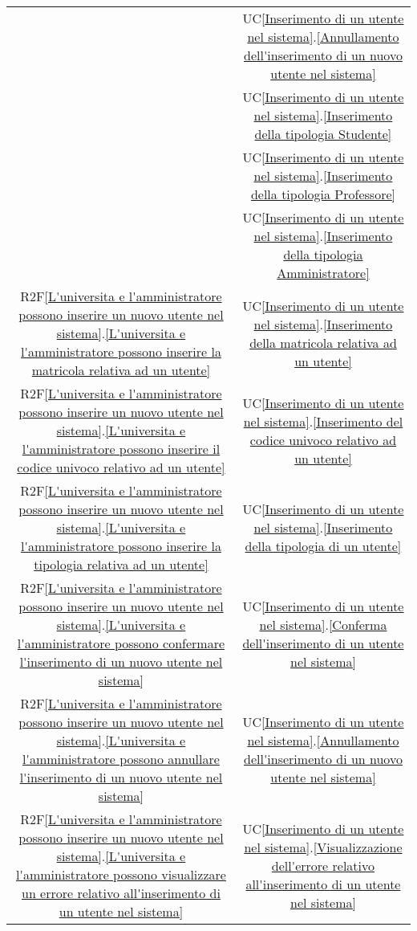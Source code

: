 \begin{longtable}{|c|c|}
& UC\ref{Inserimento di un utente nel sistema}.\ref{Annullamento dell'inserimento di un nuovo utente nel sistema}\\
& UC\ref{Inserimento di un utente nel sistema}.\ref{Inserimento della tipologia Studente}\\
& UC\ref{Inserimento di un utente nel sistema}.\ref{Inserimento della tipologia Professore}\\
& UC\ref{Inserimento di un utente nel sistema}.\ref{Inserimento della tipologia Amministratore}\\
\hline
R2F\ref{L'universita e l'amministratore possono inserire un nuovo utente nel sistema}.\ref{L'universita e l'amministratore possono inserire la matricola relativa ad un utente} & UC\ref{Inserimento di un utente nel sistema}.\ref{Inserimento della matricola relativa ad un utente}\\
\hline
R2F\ref{L'universita e l'amministratore possono inserire un nuovo utente nel sistema}.\ref{L'universita e l'amministratore possono inserire il codice univoco relativo ad un utente} & UC\ref{Inserimento di un utente nel sistema}.\ref{Inserimento del codice univoco relativo ad un utente}\\
\hline
R2F\ref{L'universita e l'amministratore possono inserire un nuovo utente nel sistema}.\ref{L'universita e l'amministratore possono inserire la tipologia relativa ad un utente} & UC\ref{Inserimento di un utente nel sistema}.\ref{Inserimento della tipologia di un utente}\\
\hline
R2F\ref{L'universita e l'amministratore possono inserire un nuovo utente nel sistema}.\ref{L'universita e l'amministratore possono confermare l'inserimento di un nuovo utente nel sistema} & UC\ref{Inserimento di un utente nel sistema}.\ref{Conferma dell'inserimento di un utente nel sistema}\\
\hline
R2F\ref{L'universita e l'amministratore possono inserire un nuovo utente nel sistema}.\ref{L'universita e l'amministratore possono annullare l'inserimento di un nuovo utente nel sistema} & UC\ref{Inserimento di un utente nel sistema}.\ref{Annullamento dell'inserimento di un nuovo utente nel sistema}\\
\hline
R2F\ref{L'universita e l'amministratore possono inserire un nuovo utente nel sistema}.\ref{L'universita e l'amministratore possono visualizzare un errore relativo all'inserimento di un utente nel sistema} & UC\ref{Inserimento di un utente nel sistema}.\ref{Visualizzazione dell'errore relativo all'inserimento di un utente nel sistema}\\

\end{longtable}
